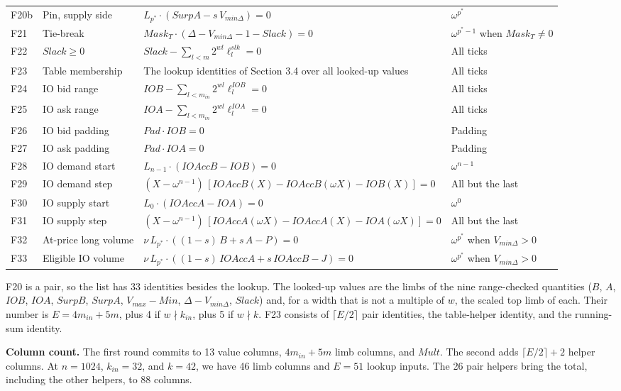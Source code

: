 \begin{longtable}[]{@{}llll@{}}
F20b & Pin, supply side & \(L_{p^*} \cdot (SurpA - s\,V_{min\Delta}) = 0\) & \(\omega^{p^*}\) \\
F21 & Tie-break & \(Mask_T \cdot (\Delta - V_{min\Delta} - 1 - Slack) = 0\) & \(\omega^{p^*-1}\) when \(Mask_T \ne 0\) \\
F22 & \(Slack \ge 0\) & \(Slack - \sum_{l<m} 2^{wl} \ell^{slk}_l = 0\) & All ticks \\
F23 & Table membership & The lookup identities of Section 3.4 over all looked-up values & All ticks \\
F24 & IO bid range & \(IOB - \sum_{l<m_{in}} 2^{wl} \ell^{IOB}_l = 0\) & All ticks \\
F25 & IO ask range & \(IOA - \sum_{l<m_{in}} 2^{wl} \ell^{IOA}_l = 0\) & All ticks \\
F26 & IO bid padding & \(Pad \cdot IOB = 0\) & Padding \\
F27 & IO ask padding & \(Pad \cdot IOA = 0\) & Padding \\
F28 & IO demand start & \(L_{n-1} \cdot (IOAccB - IOB) = 0\) & \(\omega^{n-1}\) \\
F29 & IO demand step & \((X - \omega^{n-1})\,[IOAccB(X) - IOAccB(\omega X) - IOB(X)] = 0\) & All but the last \\
F30 & IO supply start & \(L_0 \cdot (IOAccA - IOA) = 0\) & \(\omega^0\) \\
F31 & IO supply step & \((X - \omega^{n-1})\,[IOAccA(\omega X) - IOAccA(X) - IOA(\omega X)] = 0\) & All but the last \\
F32 & At-price long volume & \(\nu\, L_{p^*} \cdot ((1-s)\,B + s\,A - P) = 0\) & \(\omega^{p^*}\) when \(V_{min\Delta} > 0\) \\
F33 & Eligible IO volume & \(\nu\, L_{p^*} \cdot ((1-s)\,IOAccA + s\,IOAccB - J) = 0\) & \(\omega^{p^*}\) when \(V_{min\Delta} > 0\) \\
\end{longtable}

F20 is a pair, so the list has 33 identities besides the lookup. The looked-up values are the limbs of the nine range-checked quantities (\(B\), \(A\), \(IOB\), \(IOA\), \(SurpB\), \(SurpA\), \(V_{max} - Min\), \(\Delta - V_{min\Delta}\), \(Slack\)) and, for a width that is not a multiple of \(w\), the scaled top limb of each. Their number is \(E = 4 m_{in} + 5m\), plus 4 if \(w \nmid k_{in}\), plus 5 if \(w \nmid k\). F23 consists of \(\lceil E/2 \rceil\) pair identities, the table-helper identity, and the running-sum identity.

\textbf{Column count.} The first round commits to 13 value columns, \(4m_{in}+5m\) limb columns, and \(Mult\). The second adds \(\lceil E/2\rceil+2\) helper columns. At \(n=1024\), \(k_{in}=32\), and \(k=42\), we have 46 limb columns and \(E=51\) lookup inputs. The 26 pair helpers bring the total, including the other helpers, to 88 columns.

